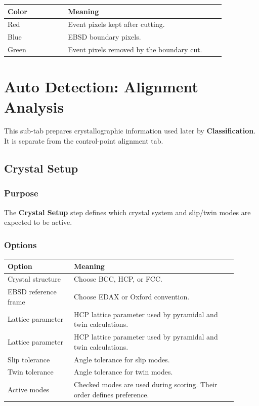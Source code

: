 \documentclass[11pt]{article}
\newcommand{\ui}[1]{\textbf{#1}}
\newcommand{\code}[1]{\texttt{\detokenize{#1}}}
\begin{document}
\begin{longtable}{p{0.25\linewidth}p{0.65\linewidth}}
\toprule
\textbf{Color} & \textbf{Meaning} \\
\midrule
Red & Event pixels kept after cutting. \\
Blue & EBSD boundary pixels. \\
Green & Event pixels removed by the boundary cut. \\
\bottomrule
\end{longtable}

\section{Auto Detection: Alignment Analysis}

This sub-tab prepares crystallographic information used later by \ui{Classification}. It is separate from the control-point alignment tab.

\subsection{Crystal Setup}

\subsubsection{Purpose}

The \ui{Crystal Setup} step defines which crystal system and slip/twin modes are expected to be active.

\subsubsection{Options}

\begin{longtable}{p{0.26\linewidth}p{0.64\linewidth}}
\toprule
\textbf{Option} & \textbf{Meaning} \\
\midrule
Crystal structure & Choose BCC, HCP, or FCC. \\
EBSD reference frame & Choose EDAX or Oxford convention. \\
Lattice parameter \code{a} & HCP lattice parameter used by pyramidal and twin calculations. \\
Lattice parameter \code{c} & HCP lattice parameter used by pyramidal and twin calculations. \\
Slip tolerance & Angle tolerance for slip modes. \\
Twin tolerance & Angle tolerance for twin modes. \\
Active modes & Checked modes are used during scoring. Their order defines preference. \\
\bottomrule
\end{longtable}
\end{document}
